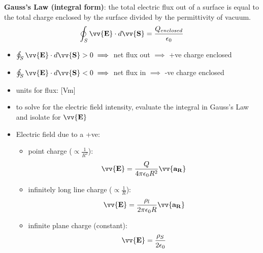 \documentclass[10pt]{article}
\begin{document}
\begin{theorem}
    \textbf{Gauss's Law (integral form)}: the total electric flux out of a surface is equal to the total charge enclosed by the surface divided by the permittivity of vacuum.
    \begin{align}
        \oint_S \vv{\mathbf{E}} \cdot d \vv{\mathbf{S}} = \frac{Q_{enclosed}}{\epsilon_0} 
    \end{align}
    \begin{itemize}
        \item $\oint_S \vv{\mathbf{E}} \cdot d \vv{\mathbf{S}} > 0 \implies$ net flux out $\implies$ +ve charge enclosed
        \item $\oint_S \vv{\mathbf{E}} \cdot d \vv{\mathbf{S}} < 0 \implies$ net flux in $\implies$ -ve charge enclosed
        \item units for flux: [Vm]
    \end{itemize}
\end{theorem}
\begin{itemize}
    \item to solve for the electric field intensity, evaluate the integral in Gauss's Law and isolate for $\vv{\mathbf{E}}$
    \item Electric field due to a +ve:
    \begin{itemize}
        \item point charge ($\propto \frac{1}{R^2}$):
            \begin{align}
                \vv{\mathbf{E}} = \frac{Q}{4\pi\epsilon_0 R^2} \vv{\mathbf{a_R}} 
            \end{align}
        \item infinitely long line charge ($\propto \frac{1}{R}$):
            \begin{align}
                \vv{\mathbf{E}} = \frac{\rho_l}{2\pi\epsilon_0 R} \vv{\mathbf{a_R}} 
            \end{align}
        \item infinite plane charge (constant):
            \begin{align}
                \vv{\mathbf{E}} = \frac{\rho_S}{2\epsilon_0}  
            \end{align}
    \end{itemize}
\end{itemize}
\end{document}

